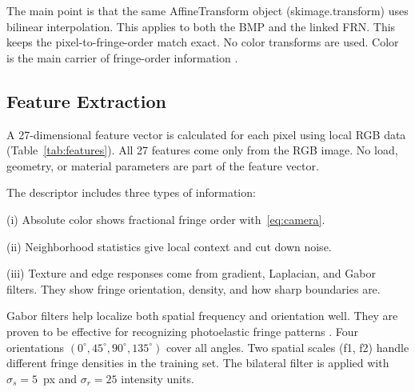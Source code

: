 \documentclass[review,12pt]{elsarticle}
\begin{document}
The main point is that the same AffineTransform object (skimage.transform) uses bilinear interpolation. This applies to both the BMP and the linked FRN. This keeps the pixel-to-fringe-order match exact. No color transforms are used. Color is the main carrier of fringe-order information \cite{ajovalasit2015,shorten2019}.

\begin{table}[H]
  \centering
  \caption{Augmentation parameter ranges. Identical transform applied to BMP and \texttt{.frn}.}
  \label{tab:augmentation}
  \small
\end{table}

\FloatBarrier
\subsection{Feature Extraction}
\label{sec:features}

A 27-dimensional feature vector is calculated for each pixel using local RGB data (Table~\ref{tab:features}). All 27 features come only from the RGB image. No load, geometry, or material parameters are part of the feature vector.

The descriptor includes three types of information:

(i) Absolute color shows fractional fringe order with~\eqref{eq:camera}.

(ii) Neighborhood statistics give local context and cut down noise.

(iii) Texture and edge responses come from gradient, Laplacian, and Gabor filters. They show fringe orientation, density, and how sharp boundaries are.

Gabor filters \cite{daugman1985} help localize both spatial frequency and orientation well. They are proven to be effective for recognizing photoelastic fringe patterns \cite{fandino2018}. Four orientations $(0^\circ, 45^\circ, 90^\circ, 135^\circ)$ cover all angles. Two spatial scales (f1, f2) handle different fringe densities in the training set. The bilateral filter \cite{tomasi1998} is applied with $\sigma_s = 5$~px and $\sigma_r = 25$ intensity units.
\end{document}
